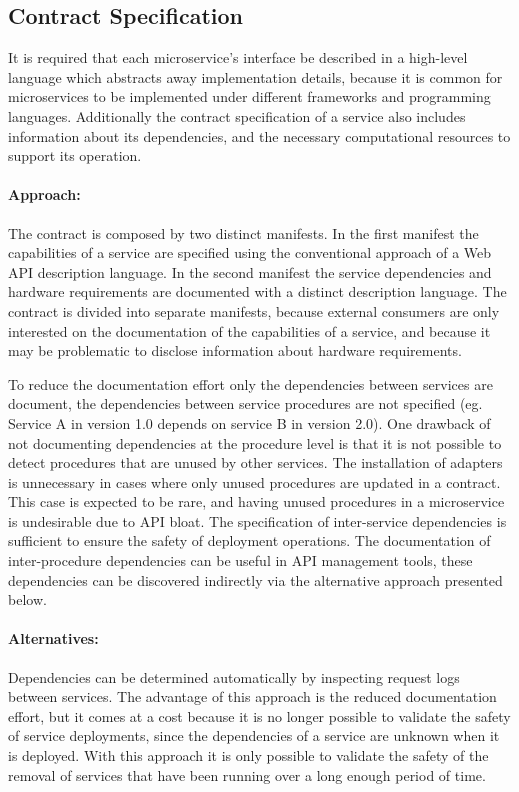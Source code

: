 \subsection{Contract Specification} %
\label{sec:contract_specification}

It is required that each microservice’s interface be
described in a high-level language which abstracts away implementation details, because it is common
for microservices to be implemented under different frameworks and programming languages.
Additionally the contract specification of a service also includes information about its dependencies, and the necessary computational resources to support its operation.

\paragraph{Approach:}
The contract is composed by two distinct manifests.
In the first manifest the capabilities of a service are specified using the conventional approach of a Web API description language.
In the second manifest the service dependencies and hardware requirements are documented with a distinct description language.
The contract is divided into separate manifests, because external consumers are only interested on the documentation of the capabilities of a service,
and because it may be problematic to disclose information about hardware requirements.

To reduce the documentation effort only the dependencies between services are document, the dependencies between service procedures are not specified (eg. Service A in version 1.0 depends on service B in version 2.0).
One drawback of not documenting dependencies at the procedure level is that it is not possible to detect procedures that are unused by other services.
The installation of adapters is unnecessary in cases where only unused procedures are updated in a contract.
This case is expected to be rare, and having unused procedures in a microservice is undesirable due to API bloat.
The specification of inter-service dependencies is sufficient to ensure the safety of deployment operations.
The documentation of inter-procedure dependencies can be useful in API management tools,
these dependencies can be discovered indirectly via the alternative approach presented below.

\paragraph{Alternatives:}
Dependencies can be determined automatically by inspecting request logs between services.
The advantage of this approach is the reduced documentation effort, but it comes at a cost because
it is no longer possible to validate the safety of service deployments, since the dependencies of a service are unknown when it is deployed.
With this approach it is only possible to validate the safety of the removal of services that have been running over a long enough period of time.

